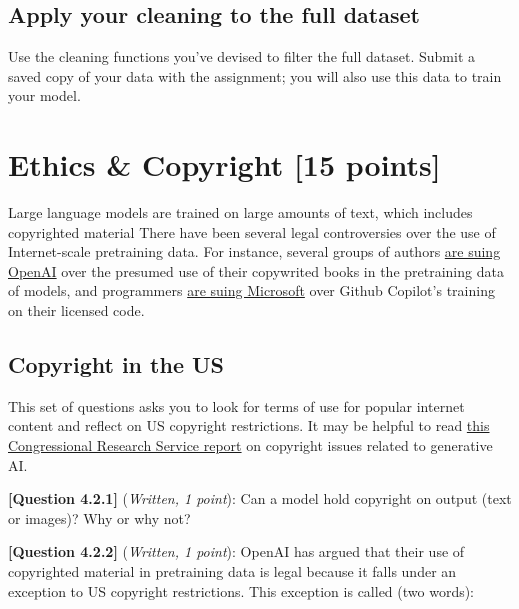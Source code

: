 \documentclass[leqno,12pt]{article}
\begin{document}
\subsection{Apply your cleaning to the full dataset}
\noindent Use the cleaning functions you've devised to filter the full dataset. Submit a saved copy of your data with the assignment; you will also use this data to train your model. 

\section{Ethics \& Copyright [15 points]}
\noindent Large language models are trained on large amounts of text, which includes copyrighted material
There have been several legal controversies over the use of Internet-scale pretraining data. For instance, several groups of authors \href{https://www.reuters.com/technology/more-writers-sue-openai-copyright-infringement-over-ai-training-2023-09-11/}{are suing OpenAI} over the presumed use of their copywrited books in the pretraining data of models, and programmers \href{https://www.nytimes.com/2022/11/23/technology/copilot-microsoft-ai-lawsuit.html?unlocked_article_code=1.8Uw.BA-U.68buEOijxL6B&smid=url-share}{are suing Microsoft} over Github Copilot's training on their licensed code. 


\subsection{Copyright in the US}
This set of questions asks you to look for terms of use for popular internet content and reflect on US copyright restrictions. It may be helpful to read \href{https://crsreports.congress.gov/product/pdf/LSB/LSB10922}{this Congressional Research Service report} on copyright issues related to generative AI.


\noindent \textbf{[Question 4.2.1]} (\emph{Written, 1 point}): Can a model hold copyright on output (text or images)? Why or why not? 
\begin{tcolorbox}[fit,height=2cm, blank, borderline={1pt}{-2pt}]\end{tcolorbox}


\noindent \textbf{[Question 4.2.2]} (\emph{Written, 1 point}): OpenAI has argued that their use of copyrighted material in pretraining data is legal because it falls under an exception to US copyright restrictions. This exception is called (two words): 
\begin{tcolorbox}[fit,height=1cm, blank, borderline={1pt}{-2pt}]
\end{tcolorbox}
\end{document}
